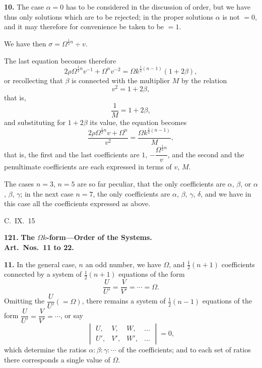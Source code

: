 \documentclass[11pt,a4paper]{book}
\begin{document}
\medskip
\noindent\textbf{10.} The case $\alpha = 0$ has to be considered in the discussion of order, but we have thus only solutions which are to be rejected; in the proper solutions $\alpha$ is not $= 0$, and it may therefore for convenience be taken to be $= 1$.

We have then $\sigma = \Omega^{\frac{1}{2}n} \div v$.

The last equation becomes therefore
\[
2\rho\Omega^{\frac{1}{2}n}v^{-1} + \Omega^n v^{-2} = \Omega k^{\frac{1}{2}(n-1)}(1 + 2\beta),
\]
or recollecting that $\beta$ is connected with the multiplier $M$ by the relation
\[
v^2 = 1 + 2\beta,
\]
that is,
\[
\frac{1}{M} = 1 + 2\beta,
\]
and substituting for $1 + 2\beta$ its value, the equation becomes
\[
\frac{2\rho\Omega^{\frac{1}{2}n}v + \Omega^n}{v^2} = \frac{\Omega k^{\frac{1}{2}(n-1)}}{M},
\]
that is, the first and the last coefficients are $1$, $-\dfrac{\Omega^{\frac{1}{2}n}}{v}$, and the second and the penultimate coefficients are each expressed in terms of $v$, $M$.

The cases $n = 3$, $n = 5$ are so far peculiar, that the only coefficients are $\alpha$, $\beta$, or $\alpha$, $\beta$, $\gamma$; in the next case $n = 7$, the only coefficients are $\alpha$, $\beta$, $\gamma$, $\delta$, and we have in this case all the coefficients expressed as above.

\begin{flushright}
C.~IX.~15
\end{flushright}



\newpage
\noindent\textbf{121.} \textbf{The $\Omega k$-form---Order of the Systems.}\\
\textbf{Art.~Nos.~11 to 22.}

\medskip
\noindent\textbf{11.} In the general case, $n$ an odd number, we have $\Omega$, and $\frac{1}{2}(n + 1)$ coefficients connected by a system of $\frac{1}{2}(n + 1)$ equations of the form
\[
\frac{U}{U'} = \frac{V}{V'} = \cdots = \Omega.
\]
Omitting the $\dfrac{U}{U'} (= \Omega)$, there remains a system of $\frac{1}{2}(n - 1)$ equations of the form $\dfrac{U}{U'} = \dfrac{V}{V'} = \cdots$, or say
\[
\begin{vmatrix} U, & V, & W, & \ldots \\ U', & V', & W', & \ldots \end{vmatrix} = 0,
\]
which determine the ratios $\alpha : \beta : \gamma : \cdots$ of the coefficients; and to each set of ratios there corresponds a single value of $\Omega$.
\end{document}
